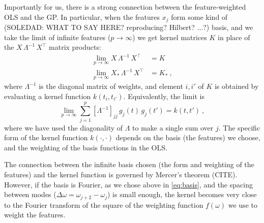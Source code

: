 \documentclass[12pt,letterpaper]{article}
\begin{document}
Importantly for us, there is a strong connection between the feature-weighted OLS and the GP.
In particular, when the features $x_j$ form some kind of (SOLEDAD: WHAT TO SAY HERE? reproducing? Hilbert? ...?) basis, and we take the limit of infinite features ($p\rightarrow\infty$) we get kernel matrices $K$ in place of the $X\,\Lambda^{-1}\,X^\top$ matrix products:
\begin{align}
    \lim_{p\rightarrow\infty} X\,\Lambda^{-1}\,X^\top &= K
    \\
    \lim_{p\rightarrow\infty} X_\ast\,\Lambda^{-1}\,X^\top &= K_\ast
    ~,
    \label{eq.limit}
\end{align}
where $\Lambda^{-1}$ is the diagonal matrix of weights, and element $i,i'$ of $K$ is obtained by evaluating a kernel function $k(t_i,t_{i'})$.
Equivalently, the limit is
\begin{equation}
    \lim_{p\rightarrow\infty} \sum_{j=1}^p [\Lambda^{-1}]_{jj}\,g_j(t)\,g_{j}(t') = k(t, t')
    ~,
\end{equation}
where we have used the diagonality of $\Lambda$ to make a single sum over $j$.
The specific form of the kernel function $k(\cdot,\cdot)$ depends on the basis (the features) we choose, and the weighting of the basis functions in the OLS.

The connection between the infinite basis chosen (the form and weighting of the features) and the kernel function is governed by Mercer's theorem (CITE).
However, if the basis is Fourier, as we chose above in \eqref{eq:basis}, and the spacing between modes ($\Delta\omega =\omega_{j+2}-\omega_j$) is small enough, the kernel becomes very close to the Fourier transform of the square of the weighting function $f(\omega)$ we use to weight the features.
\end{document}
